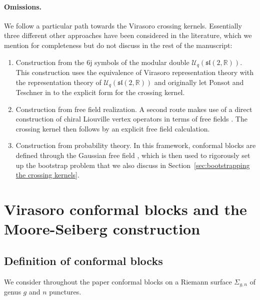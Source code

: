 \documentclass[12pt,a4paper]{article}
\begin{document}
\paragraph{Omissions.} We follow a particular path towards the Virasoro crossing kernels. Essentially three different other approaches have been considered in the literature, which we mention for completeness but do not discuss in the rest of the manuscript:
\begin{enumerate}
\item Construction from the 6j symbols of the modular double $\mathcal{U}_q(\mathfrak{sl}(2,\mathbb{R}))$. This construction uses the equivalence of Virasoro representation theory with the representation theory of $\mathcal{U}_q(\mathfrak{sl}(2,\mathbb{R}))$ and originally let Ponsot and Teschner in \cite{Ponsot:2000mt} to the explicit form for the crossing kernel.
\item Construction from free field realization. A second route makes use of a direct construction of chiral Liouville vertex operators in terms of free fields \cite{Teschner:2001rv, Teschner:2003en}. The crossing kernel then follows by an explicit free field calculation.
\item Construction from probability theory. In this framework, conformal blocks are defined through the Gaussian free field \cite{Ghosal}, which is then used to rigorously set up the bootstrap problem that we also discuss in Section~\ref{sec:bootstrapping the crossing kernels}. 
\end{enumerate}






\section{Virasoro conformal blocks and the Moore-Seiberg construction} \label{sec:Virasoro conformal blocks}
\subsection{Definition of conformal blocks} \label{subsec:definition of conformal blocks}
We consider throughout the paper conformal blocks on a Riemann surface $\Sigma_{g,n}$ of genus $g$ and $n$ punctures.
\end{document}
